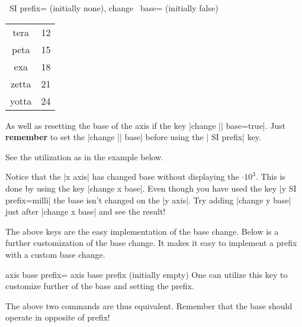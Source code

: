 \begin{pgfplotsxykeylist}{%
    \x\ SI prefix= (initially none),
    change \x\ base= (initially false)%
}
\begin{center}
\begin{tabular}{>{\ttfamily}cc}
            tera             & 12    \\
            peta             & 15    \\
            exa              & 18    \\
            zetta            & 21    \\
            yotta            & 24    \\
                \bottomrule
        \end{tabular}
    \end{center}
    As well as resetting the base of the axis if the key
    |change || base=true|. Just \textbf{remember} to set the
    |change || base| before using the | SI prefix| key.

    See the utilization as in the example below.
\begin{codeexample}[]
\end{codeexample}
    Notice that the |x axis| has changed base without displaying the $\cdot
    10^{3}$. This is done by using the key |change x base|. Even though you
    have used the key |y SI prefix=milli| the base isn't changed on the
    |y axis|. Try adding |change y base| just after |change x base| and see the
    result!
\end{pgfplotsxykeylist}

The above keys are the easy implementation of the base change. Below is a
further customization of the base change. It makes it easy to implement a
prefix with a custom base change.

\begin{pgfplotskey}{axis base prefix=%
    {axis  base  prefix } (initially empty)%
}
    One can utilize this key to customize further of the base and setting the
    prefix.
\begin{codeexample}
\pgfplotsset{change x base,x SI prefix=kilo}
\end{codeexample}
    The above two commands are thus equivalent. Remember that the base should
    operate in opposite of prefix!
\end{pgfplotskey}
\endgroup
